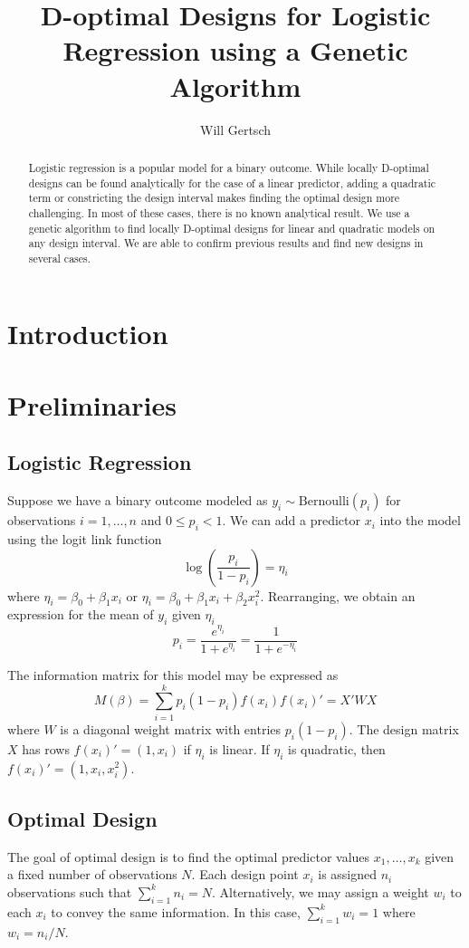 \documentclass[11pt,a4paper]{article}
\title{D-optimal Designs for Logistic Regression using a Genetic Algorithm}
\author{Will Gertsch}
\begin{document}
\maketitle

\begin{abstract}
Logistic regression is a popular model for a binary outcome. While locally D-optimal designs can be found analytically for the case of a linear predictor, adding a quadratic term or constricting the design interval makes finding the optimal design more challenging. In most of these cases, there is no known analytical result. We use  a genetic algorithm to find locally D-optimal designs for linear and quadratic models on any design interval. We are able to confirm previous results and find new designs in several cases. 
\end{abstract}

\section{Introduction}
\section{Preliminaries}
\subsection{Logistic Regression}
Suppose we have a binary outcome modeled as $y_i \sim \text{Bernoulli}(p_i)$ for observations $i = 1, \dots, n$ and $0 \leq p_i < 1$. We can add a predictor $x_i$ into the model using the logit link function
$$
\log\left( \frac{p_i}{1-p_i}\right) = \eta_i
$$
where $\eta_i = \beta_0  + \beta_1 x_{i}$ or $\eta_i = \beta_0  + \beta_1 x_{i} + \beta_2 x_i^2$. Rearranging, we obtain an expression for the mean of $y_i$ given $\eta_i$
$$
p_i = \frac{e^{\eta_i}}{1+e^{\eta_i}}= \frac{1}{1+e^{-\eta_i}} 
$$

The information matrix for this model may be expressed as
$$
M(\beta) = \sum_{i=1}^k p_i (1-p_i) f(x_i) f(x_i)' = X'WX
$$
where $W$ is a diagonal weight matrix with entries $p_i (1-p_i)$. The design matrix $X$ has rows $f(x_i)' = (1, x_i)$ if $\eta_i$ is linear. If $\eta_i$ is quadratic, then $f(x_i)' = (1,x_i,x_i^2)$.
\subsection{Optimal Design}
The goal of optimal design is to find the optimal predictor values $x_1,\dots, x_k $ given a fixed number of observations $N$. Each design point $x_i$ is assigned $n_i$ observations such that $\sum_{i=1}^k n_i = N$. Alternatively, we may assign a weight $w_i$ to each $x_i$ to convey the same information. In this case, $\sum_{i=1}^k w_i = 1$ where $w_i = n_i/N$.
\end{document}
